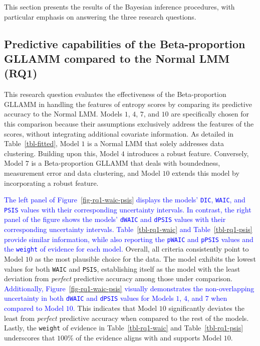 \documentclass[
  authoryear,
  preprint,
  1p]{elsarticle}
\begin{document}
This section presents the results of the Bayesian inference procedures,
with particular emphasis on answering the three research questions.

\subsection{Predictive capabilities of the Beta-proportion GLLAMM
compared to the Normal LMM (RQ1)}\label{sec-R-RQ1}

This research question evaluates the effectiveness of the
Beta-proportion GLLAMM in handling the features of entropy scores by
comparing its predictive accuracy to the Normal LMM. Models \(1\),
\(4\), \(7\), and \(10\) are specifically chosen for this comparison
because their assumptions exclusively address the features of the
scores, without integrating additional covariate information. As
detailed in Table~\ref{tbl-fitted}, Model \(1\) is a Normal LMM that
solely addresses data clustering. Building upon this, Model \(4\)
introduces a robust feature. Conversely, Model \(7\) is a
Beta-proportion GLLAMM that deals with boundedness, measurement error
and data clustering, and Model \(10\) extends this model by
incorporating a robust feature.

\textcolor{blue}{The left panel of Figure~\ref{fig-rq1-waic-psis} displays the models'
\texttt{DIC}, \texttt{WAIC}, and \texttt{PSIS} values with their
corresponding uncertainty intervals. In contrast, the right panel of the
figure shows the models' \texttt{dWAIC} and \texttt{dPSIS} values with
their corresponding uncertainty intervals. Table~\ref{tbl-rq1-waic} and
Table~\ref{tbl-rq1-psis} provide similar information, while also
reporting the \texttt{pWAIC} and \texttt{pPSIS} values and the
\texttt{weight} of evidence for each model.} Overall, all criteria
consistently point to Model \(10\) as the most plausible choice for the
data. The model exhibits the lowest values for both \texttt{WAIC} and
\texttt{PSIS}, establishing itself as the model with the least deviation
from \emph{perfect} predictive accuracy among those under comparison.
\textcolor{blue}{Additionally, Figure~\ref{fig-rq1-waic-psis} visually demonstrates the
non-overlapping uncertainty in both \texttt{dWAIC} and \texttt{dPSIS}
values for Models \(1\), \(4\), and \(7\) when compared to Model
\(10\).} This indicates that Model \(10\) significantly deviates the
least from \emph{perfect} predictive accuracy when compared to the rest
of the models. Lastly, the \texttt{weight} of evidence in
Table~\ref{tbl-rq1-waic} and Table~\ref{tbl-rq1-psis} underscores that
\(100\%\) of the evidence aligns with and supports Model \(10\).
\end{document}
